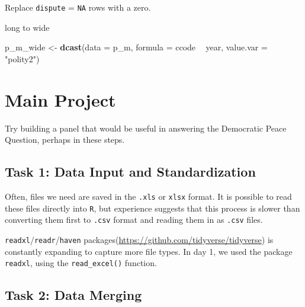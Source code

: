 \documentclass[]{book}
\newenvironment{Shaded}{\begin{snugshade}}{\end{snugshade}}
\newcommand{\KeywordTok}[1]{\textcolor[rgb]{0.13,0.29,0.53}{\textbf{#1}}}
\newcommand{\DataTypeTok}[1]{\textcolor[rgb]{0.13,0.29,0.53}{#1}}
\newcommand{\DecValTok}[1]{\textcolor[rgb]{0.00,0.00,0.81}{#1}}
\newcommand{\StringTok}[1]{\textcolor[rgb]{0.31,0.60,0.02}{#1}}
\newcommand{\OperatorTok}[1]{\textcolor[rgb]{0.81,0.36,0.00}{\textbf{#1}}}
\newcommand{\NormalTok}[1]{#1}
\theoremstyle{definition}
\theoremstyle{definition}
\theoremstyle{definition}
\theoremstyle{remark}
\begin{document}
Replace \texttt{dispute} = \texttt{NA} rows with a zero.

\begin{Shaded}
\end{Shaded}

long to wide

\begin{Shaded}
\begin{Highlighting}[]
\NormalTok{p_m_wide <-}\StringTok{ }\KeywordTok{dcast}\NormalTok{(}\DataTypeTok{data =}\NormalTok{ p_m,}
                  \DataTypeTok{formula =}\NormalTok{ ccode }\OperatorTok{~}\StringTok{ }\NormalTok{year,}
                  \DataTypeTok{value.var =} \StringTok{"polity2"}\NormalTok{)}
\end{Highlighting}
\end{Shaded}

\section{Main Project}\label{main-project}

Try building a panel that would be useful in answering the Democratic
Peace Question, perhaps in these steps.

\subsection*{Task 1: Data Input and
Standardization}\label{task-1-data-input-and-standardization}

Often, files we need are saved in the \texttt{.xls} or \texttt{xlsx}
format. It is possible to read these files directly into \texttt{R}, but
experience suggests that this process is slower than converting them
first to \texttt{.csv} format and reading them in as \texttt{.csv}
files.

\texttt{readxl}/\texttt{readr}/\texttt{haven}
packages(\url{https://github.com/tidyverse/tidyverse}) is constantly
expanding to capture more file types. In day 1, we used the package
\texttt{readxl}, using the \texttt{read\_excel()} function.

\subsection*{Task 2: Data Merging}\label{task-2-data-merging}
\end{document}
